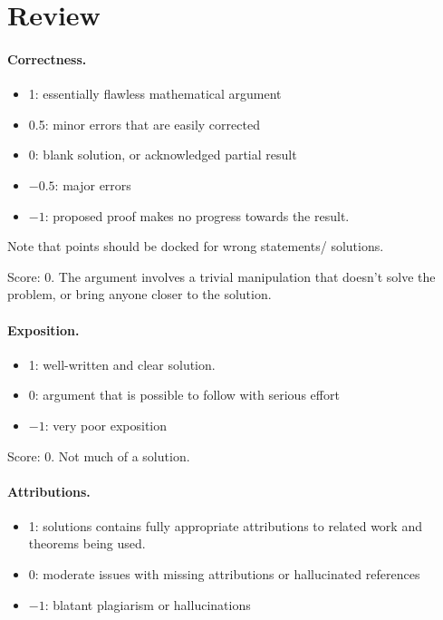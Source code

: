\documentclass[11pt]{article}
\theoremstyle{definition}
\theoremstyle{remark}
\begin{document}
\maketitle

\section{Review}

\paragraph{Correctness.}
\begin{itemize}
	\item  1: essentially flawless mathematical argument
	\item  0.5: minor errors that are easily corrected
	\item  0: blank solution, or acknowledged partial result
	\item  $-0.5$: major errors
	\item  $-1$: proposed proof makes no progress towards the result.
\end{itemize}
Note that points should be docked for wrong statements/ solutions.

\noindent Score: 0.
The argument involves a trivial manipulation that doesn't solve the problem, or bring anyone closer to the solution.

\paragraph{Exposition.}
\begin{itemize}
	\item  1: well-written and clear solution.
	\item  0: argument that is possible to follow with serious effort
	\item  $-1$: very poor exposition
\end{itemize}

\noindent Score: 0.
Not much of a solution.

\paragraph{Attributions.}
\begin{itemize}
	\item  1: solutions contains fully appropriate attributions
		to related work and theorems being used.
	\item  0: moderate issues with missing attributions or hallucinated references
	\item  $-1$: blatant plagiarism or hallucinations
\end{itemize}
\end{document}
